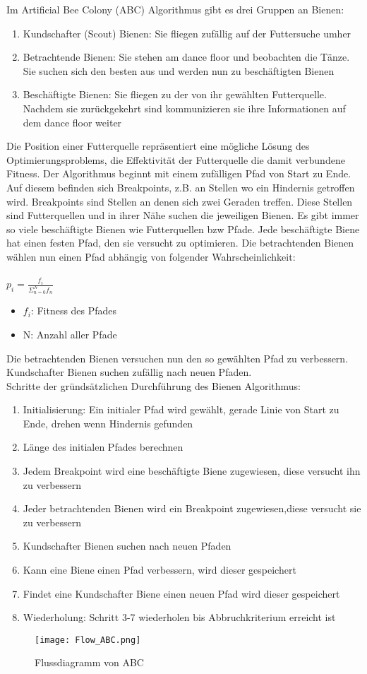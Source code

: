 Im Artificial Bee Colony (ABC) Algorithmus gibt es drei Gruppen an Bienen:
\begin{enumerate}
  \item Kundschafter (Scout) Bienen: Sie fliegen zufällig auf der Futtersuche umher
  \item Betrachtende Bienen: Sie stehen am dance floor und beobachten die Tänze. Sie suchen sich den besten aus und werden nun zu beschäftigten Bienen
  \item Beschäftigte Bienen: Sie fliegen zu der von ihr gewählten Futterquelle. Nachdem sie zurückgekehrt sind kommunizieren sie ihre Informationen auf dem dance floor weiter
\end{enumerate} 

Die Position einer Futterquelle repräsentiert eine mögliche Lösung des Optimierungsproblems, die Effektivität der Futterquelle die damit verbundene Fitness.
Der Algorithmus beginnt mit einem zufälligen Pfad von Start zu Ende. Auf diesem befinden sich Breakpoints, z.B. an Stellen wo ein Hindernis getroffen wird.
Breakpoints sind Stellen an denen sich zwei Geraden treffen. Diese Stellen sind Futterquellen und in ihrer Nähe suchen die jeweiligen Bienen. 
Es gibt immer so viele beschäftigte Bienen wie Futterquellen bzw Pfade. Jede beschäftigte Biene hat einen festen Pfad, den sie versucht zu optimieren\cite{pham2005bees}. 
Die betrachtenden Bienen wählen nun einen Pfad abhängig von folgender Wahrscheinlichkeit:\\\\
\large
$p_i=\frac{f_i}{\Sigma^N_{n=0}f_n}$
\normalsize
\begin{itemize}
  \item $f_i$: Fitness des Pfades
  \item N: Anzahl aller Pfade
\end{itemize}
Die betrachtenden Bienen versuchen nun den so gewählten Pfad zu verbessern. Kundschafter Bienen suchen zufällig nach neuen Pfaden.\\
Schritte der gründsätzlichen Durchführung des Bienen Algorithmus:
\begin{enumerate}
  \item Initialisierung: Ein initialer Pfad wird gewählt, gerade Linie von Start zu Ende, drehen wenn Hindernis gefunden
  \item Länge des initialen Pfades berechnen
  \item Jedem Breakpoint wird eine beschäftigte Biene zugewiesen, diese versucht ihn zu verbessern
  \item Jeder betrachtenden Bienen wird ein Breakpoint zugewiesen,diese versucht sie zu verbessern
  \item Kundschafter Bienen suchen nach neuen Pfaden
  \item Kann eine Biene einen Pfad verbessern, wird dieser gespeichert
  \item Findet eine Kundschafter Biene einen neuen Pfad wird dieser gespeichert
  \item Wiederholung: Schritt 3-7 wiederholen bis Abbruchkriterium erreicht ist
\end{enumerate}

\begin{figure}
  \centering
  \texttt{[image: Flow\_ABC.png]}
  \caption{Flussdiagramm von ABC}
  \label{fig:Figure_ABC}
\end{figure}
